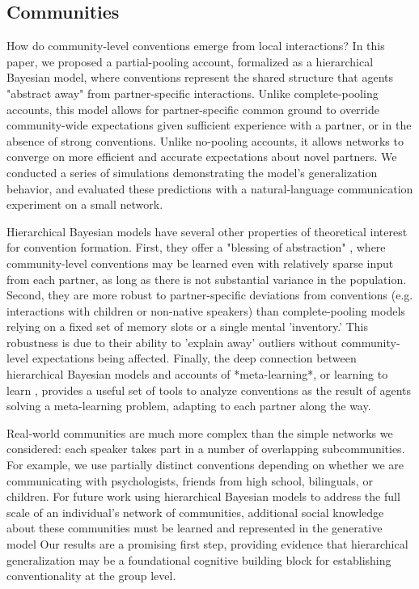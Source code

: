 \subsection{Communities}

How do community-level conventions emerge from local interactions? 
In this paper, we proposed a partial-pooling account, formalized as a hierarchical Bayesian model, where conventions represent the shared structure that agents "abstract away" from partner-specific interactions.
Unlike complete-pooling accounts, this model allows for partner-specific common ground to override community-wide expectations given sufficient experience with a partner, or in the absence of strong conventions.
Unlike no-pooling accounts, it allows networks to converge on more efficient and accurate expectations about novel partners.
We conducted a series of simulations demonstrating the model's generalization behavior, and evaluated these predictions with a natural-language communication experiment on a small network.

Hierarchical Bayesian models have several other properties of theoretical interest for convention formation.
First, they offer a "blessing of abstraction" \cite{GoodmanUllmanTenenbaum11_TheoryOfCausality}, where community-level conventions may be learned even with relatively sparse input from each partner, as long as there is not substantial variance in the population. 
Second, they are more robust to partner-specific deviations from conventions (e.g. interactions with children or non-native speakers) than complete-pooling models relying on a fixed set of memory slots or a single mental 'inventory.' 
This robustness is due to their ability to 'explain away' outliers without community-level expectations being affected. 
Finally, the deep connection between hierarchical Bayesian models and accounts of *meta-learning*, or learning to learn \cite{grant_recasting_2018}, provides a useful set of tools to analyze conventions as the result of agents solving a meta-learning problem, adapting to each partner along the way.

Real-world communities are much more complex than the simple networks we considered: each speaker takes part in a number of overlapping subcommunities. 
For example, we use partially distinct conventions depending on whether we are communicating with psychologists, friends from high school, bilinguals, or children.
For future work using hierarchical Bayesian models to address the full scale of an individual's  network of communities, additional social knowledge about these communities must be learned and represented in the generative model \cite[e.g.]{gershman_learning_2017} 
Our results are a promising first step, providing evidence that hierarchical generalization may be a foundational cognitive building block for establishing conventionality at the group level.
